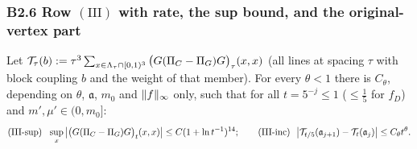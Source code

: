 
\subsubsection*{B2.6 Row $(\mathrm{III})$ with rate, the sup bound, and the original-vertex part}

\begin{theorem}\label{app:a04:thm:III}
Let $\mathcal T_\tau(b):=\tau^3\sum_{x\in\Lambda_\tau\cap[0,1)^3}\big(G(\Pi_C-\Pi_G)G\big)_\tau(x,x)$ (all lines at spacing $\tau$ with block coupling $b$ and the weight of that member). For every $\theta<1$ there is $C_\theta$, depending on $\theta$, $\mathfrak a$, $m_0$ and $\lVert f\rVert_\infty$ only, such that for all $t=5^{-j}\le1$ ($\le\frac15$ for $f_D$) and $m',\mu'\in(0,m_0]$:
\[
\textup{(III-sup)}\ \ \sup_x\big|\big(G(\Pi_C-\Pi_G)G\big)_t(x,x)\big|\le C(1+\ln t^{-1})^{14};\qquad
\textup{(III-inc)}\ \ \big|\cT_{t/5}(\mathfrak a_{j+1})-\cT_t(\mathfrak a_j)\big|\le C_\theta t^\theta.
\]
\end{theorem}
